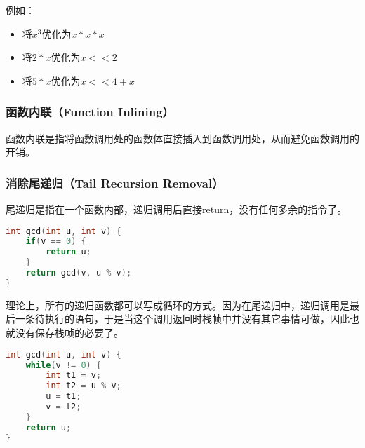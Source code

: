 例如：

\begin{itemize}
    \item 将$ x^3 $优化为$ x * x * x $
    \item 将$ 2 * x $优化为$ x << 2 $
    \item 将$ 5 * x $优化为$ x << 4 + x $
\end{itemize}

\vspace{0.5cm}

\subsubsection{函数内联（Function Inlining）}

函数内联是指将函数调用处的函数体直接插入到函数调用处，从而避免函数调用的开销。\\

\subsubsection{消除尾递归（Tail Recursion Removal）}

尾递归是指在一个函数内部，递归调用后直接return，没有任何多余的指令了。

\vspace{-0.5cm}

\begin{lstlisting}[language=C]
int gcd(int u, int v) {
    if(v == 0) {
        return u;
    }
    return gcd(v, u % v);
}
\end{lstlisting}

理论上，所有的递归函数都可以写成循环的方式。因为在尾递归中，递归调用是最后一条待执行的语句，于是当这个调用返回时栈帧中并没有其它事情可做，因此也就没有保存栈帧的必要了。
\vspace{-0.5cm}

\begin{lstlisting}[language=C]
int gcd(int u, int v) {
    while(v != 0) {
        int t1 = v;
        int t2 = u % v;
        u = t1;
        v = t2;
    }
    return u;
}
\end{lstlisting}

\newpage